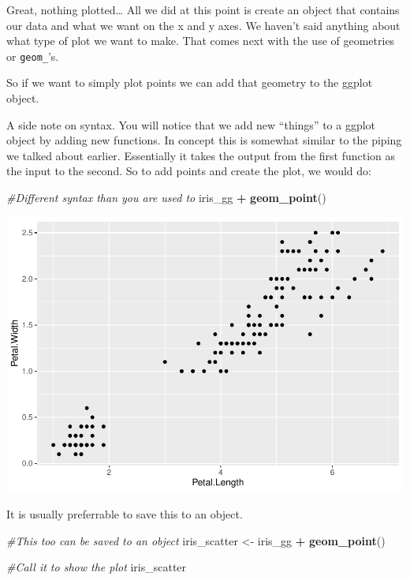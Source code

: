 \documentclass[]{article}
\newenvironment{Shaded}{\begin{snugshade}}{\end{snugshade}}
\newcommand{\CommentTok}[1]{\textcolor[rgb]{0.56,0.35,0.01}{\textit{#1}}}
\newcommand{\KeywordTok}[1]{\textcolor[rgb]{0.13,0.29,0.53}{\textbf{#1}}}
\newcommand{\NormalTok}[1]{#1}
\newcommand{\OperatorTok}[1]{\textcolor[rgb]{0.81,0.36,0.00}{\textbf{#1}}}
\newcommand{\StringTok}[1]{\textcolor[rgb]{0.31,0.60,0.02}{#1}}
\begin{document}
Great, nothing plotted\ldots{} All we did at this point is create an
object that contains our data and what we want on the x and y axes. We
haven't said anything about what type of plot we want to make. That
comes next with the use of geometries or \texttt{geom\_}'s.

So if we want to simply plot points we can add that geometry to the
ggplot object.

A side note on syntax. You will notice that we add new ``things'' to a
ggplot object by adding new functions. In concept this is somewhat
similar to the piping we talked about earlier. Essentially it takes the
output from the first function as the input to the second. So to add
points and create the plot, we would do:

\begin{Shaded}
\begin{Highlighting}[]
\CommentTok{#Different syntax than you are used to}
\NormalTok{iris_gg }\OperatorTok{+}\StringTok{ }
\StringTok{  }\KeywordTok{geom_point}\NormalTok{()}
\end{Highlighting}
\end{Shaded}

\includegraphics{figures/unnamed-chunk-3-1.pdf}

It is usually preferrable to save this to an object.

\begin{Shaded}
\begin{Highlighting}[]
\CommentTok{#This too can be saved to an object}
\NormalTok{iris_scatter <-}\StringTok{ }\NormalTok{iris_gg }\OperatorTok{+}
\StringTok{  }\KeywordTok{geom_point}\NormalTok{()}

\CommentTok{#Call it to show the plot}
\NormalTok{iris_scatter}
\end{Highlighting}
\end{Shaded}
\end{document}
